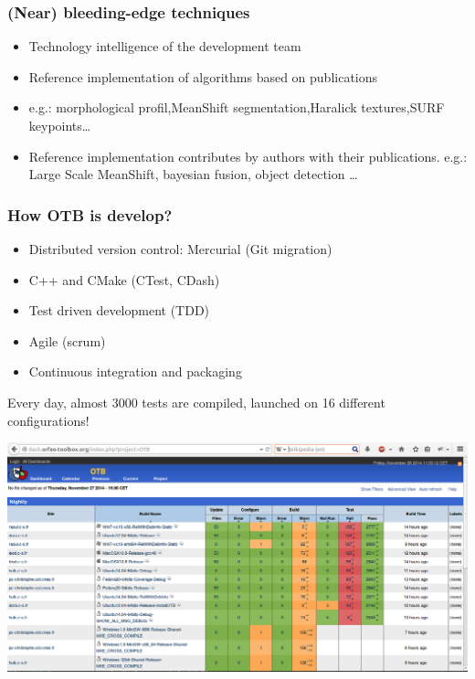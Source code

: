 \documentclass[8pt]{beamer}
\begin{document}
\begin{frame}
\frametitle{(Near) bleeding-edge techniques}
\begin{itemize}
\item Technology intelligence of the development team
\item Reference implementation of algorithms based on publications
\item e.g.: morphological profil,MeanShift segmentation,Haralick textures,SURF keypoints\ldots
\item Reference implementation contributes by authors with their
  publications. e.g.: Large Scale MeanShift, bayesian fusion, object detection \ldots
\end{itemize}
\end{frame}

\begin{frame}
\frametitle{How OTB is develop?}
\vspace{-0.5cm}
\begin{itemize}
\item Distributed version control: Mercurial (Git migration)
\item C++ and CMake (CTest, CDash)
\item Test driven development (TDD)
\item Agile (scrum)
\item Continuous integration and packaging
\end{itemize}
Every day, almost 3000 tests are compiled, launched on 16 different configurations!
\begin{center}
\href{http://dash.orfeo-toolbox.org/index.php?project=OTB}{\includegraphics[width=\textwidth,trim=0 250 0 0,clip=true]{images/dashboard.png}}
\end{center}
\end{frame}
\end{document}
